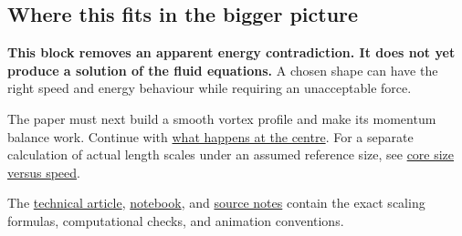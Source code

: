 \documentclass[
  english,
  11pt,
]{article}
\begin{document}
\subsection{Where this fits in the bigger
picture}\label{where-this-fits-in-the-bigger-picture}

\textbf{This block removes an apparent energy contradiction. It does not
yet produce a solution of the fluid equations.} A chosen shape can have
the right speed and energy behaviour while requiring an unacceptable
force.

The paper must next build a smooth vortex profile and make its momentum
balance work. Continue with \href{../d6_inner_profile/article.html}{what
happens at the centre}. For a separate calculation of actual length
scales under an assumed reference size, see
\href{../d1_core_size/article.html}{core size versus speed}.

The \href{technical-article.html}{technical article},
\href{../../code/d2_finite_energy/study.ipynb}{notebook}, and
\href{source-notes.md}{source notes} contain the exact scaling formulas,
computational checks, and animation conventions.
\end{document}

